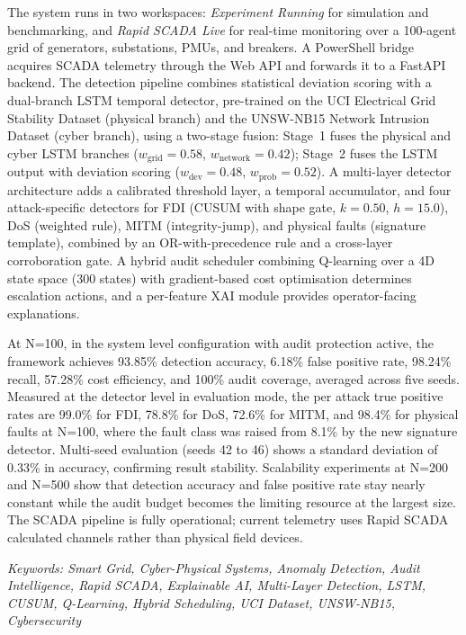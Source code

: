 \documentclass[12pt]{report}
\begin{document}
\par \vspace{0.35cm}
The system runs in two workspaces: \textit{Experiment Running} for simulation and benchmarking, and \textit{Rapid SCADA Live} for real-time monitoring over a 100-agent grid of generators, substations, PMUs, and breakers. A PowerShell bridge acquires SCADA telemetry through the Web API and forwards it to a FastAPI backend. The detection pipeline combines statistical deviation scoring with a dual-branch LSTM temporal detector, pre-trained on the UCI Electrical Grid Stability Dataset (physical branch) and the UNSW-NB15 Network Intrusion Dataset (cyber branch), using a two-stage fusion: Stage~1 fuses the physical and cyber LSTM branches ($w_{\text{grid}}=0.58$, $w_{\text{network}}=0.42$); Stage~2 fuses the LSTM output with deviation scoring ($w_{\text{dev}}=0.48$, $w_{\text{prob}}=0.52$). A multi-layer detector architecture adds a calibrated threshold layer, a temporal accumulator, and four attack-specific detectors for FDI (CUSUM with shape gate, $k=0.50$, $h=15.0$), DoS (weighted rule), MITM (integrity-jump), and physical faults (signature template), combined by an OR-with-precedence rule and a cross-layer corroboration gate. A hybrid audit scheduler combining Q-learning over a 4D state space (300 states) with gradient-based cost optimisation determines escalation actions, and a per-feature XAI module provides operator-facing explanations.

\par \vspace{0.35cm}
At N=100, in the system level configuration with audit protection active, the framework achieves 93.85\% detection accuracy, 6.18\% false positive rate, 98.24\% recall, 57.28\% cost efficiency, and 100\% audit coverage, averaged across five seeds. Measured at the detector level in evaluation mode, the per attack true positive rates are 99.0\% for FDI, 78.8\% for DoS, 72.6\% for MITM, and 98.4\% for physical faults at N=100, where the fault class was raised from 8.1\% by the new signature detector. Multi-seed evaluation (seeds 42 to 46) shows a standard deviation of 0.33\% in accuracy, confirming result stability. Scalability experiments at N=200 and N=500 show that detection accuracy and false positive rate stay nearly constant while the audit budget becomes the limiting resource at the largest size. The SCADA pipeline is fully operational; current telemetry uses Rapid SCADA calculated channels rather than physical field devices.

\par \vspace{0.35cm}
\textit{Keywords: Smart Grid, Cyber-Physical Systems, Anomaly Detection, Audit Intelligence, Rapid SCADA, Explainable AI, Multi-Layer Detection, LSTM, CUSUM, Q-Learning, Hybrid Scheduling, UCI Dataset, UNSW-NB15, Cybersecurity}
\end{document}

